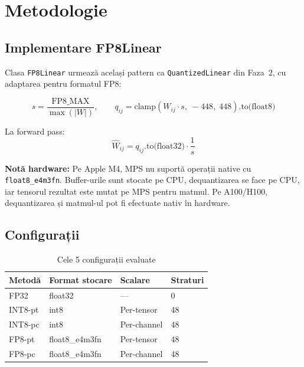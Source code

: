 \documentclass[12pt,a4paper]{article}
\begin{document}
\section{Metodologie}

\subsection{Implementare FP8Linear}

Clasa \texttt{FP8Linear} urmează același pattern ca \texttt{QuantizedLinear}
din Faza~2, cu adaptarea pentru formatul FP8:

\begin{equation}
  s = \frac{\text{FP8\_MAX}}{\max(|W|)}, \qquad
  q_{ij} = \text{clamp}(W_{ij} \cdot s,\; -448,\; 448).\text{to(float8)}
\end{equation}

La forward pass:
\begin{equation}
  \hat{W}_{ij} = q_{ij}.\text{to(float32)} \cdot \frac{1}{s}
\end{equation}

\textbf{Notă hardware:} Pe Apple M4, MPS nu suportă operații native cu
\texttt{float8\_e4m3fn}. Buffer-urile sunt stocate pe CPU, dequantizarea
se face pe CPU, iar tensorul rezultat este mutat pe MPS pentru matmul.
Pe A100/H100, dequantizarea și matmul-ul pot fi efectuate nativ în hardware.

\subsection{Configurații}

\begin{table}[H]
  \centering
  \caption{Cele 5 configurații evaluate}
  \begin{tabular}{llll}
    \toprule
    \textbf{Metodă} & \textbf{Format stocare} & \textbf{Scalare} & \textbf{Straturi} \\
    \midrule
    FP32       & float32  & ---           & 0 \\
    INT8-pt    & int8     & Per-tensor    & 48 \\
    INT8-pc    & int8     & Per-channel   & 48 \\
    FP8-pt     & float8\_e4m3fn & Per-tensor  & 48 \\
    FP8-pc     & float8\_e4m3fn & Per-channel & 48 \\
    \bottomrule
  \end{tabular}
  \label{tab:configs}
\end{table}
\end{document}
